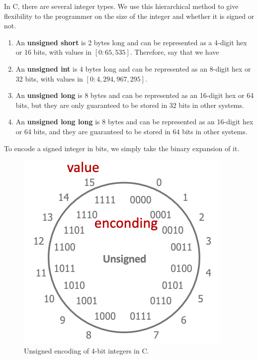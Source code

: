 \documentclass{article}
\begin{document}
    \begin{definition}
      In C, there are several integer types. We use this hierarchical method to give flexibility to the programmer on the size of the integer and whether it is signed or not. 
      \begin{enumerate} 
        \item An \textbf{unsigned short} is 2 bytes long and can be represented as a 4-digit hex or 16 bits, with values in $[0:65,535]$. Therefore, say that we have 
        \item An \textbf{unsigned int} is 4 bytes long and can be represented as an 8-digit hex or 32 bits, with values in $[0:4,294,967,295]$. 
        \item An \textbf{unsigned long} is 8 bytes and can be represented as an 16-digit hex or 64 bits, but they are only guaranteed to be stored in 32 bits in other systems. 
        \item An \textbf{unsigned long long} is 8 bytes and can be represented as an 16-digit hex or 64 bits, and they are guaranteed to be stored in 64 bits in other systems. 
      \end{enumerate} 
    \end{definition}

    \begin{theorem}
      To encode a signed integer in bits, we simply take the binary expansion of it. 
      \begin{figure}[H]
        \centering 
        \includegraphics[scale=0.4]{img/unsigned_encoding.png}
        \caption{Unsigned encoding of 4-bit integers in C. } 
        \label{fig:unsigned_encoding}
      \end{figure}
    \end{theorem}
\end{document}
